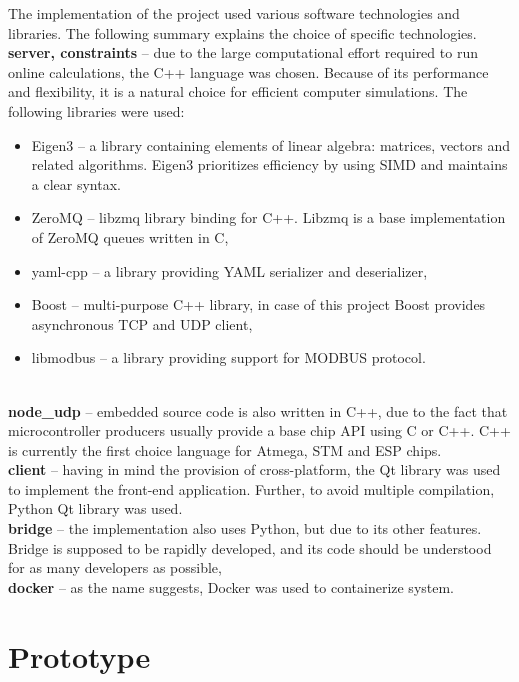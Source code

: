 The implementation of the project used various software technologies and libraries. The following summary explains the choice of specific technologies.\\

\noindent\textbf{server, constraints} -- due to the large computational effort required to run online calculations, the C++ language was chosen. Because of its performance and flexibility, it is a natural choice for efficient computer simulations. The following libraries were used:
\begin{itemize}[noitemsep,nolistsep]
	\item Eigen3 -- a library containing elements of linear algebra: matrices, vectors and related algorithms. Eigen3 prioritizes efficiency by using SIMD and maintains a clear syntax.
	\item ZeroMQ -- libzmq library binding for C++. Libzmq is a base implementation of ZeroMQ queues written in C,
	\item yaml-cpp -- a library providing YAML serializer and deserializer,
	\item Boost -- multi-purpose C++ library, in case of this project Boost provides asynchronous TCP and UDP client,
	\item libmodbus -- a library providing support for MODBUS protocol.
\end{itemize}
\  \\
\textbf{node\_udp} -- embedded source code is also written in C++, due to the fact that microcontroller producers usually provide a base chip API using C or C++. C++ is currently the first choice language for Atmega, STM and ESP chips.\\

\noindent\textbf{client} -- having in mind the provision of cross-platform, the Qt library was used to implement the front-end application. Further, to avoid multiple compilation, Python Qt library was used. \\

\noindent\textbf{bridge} -- the implementation also uses Python, but due to its other features. Bridge is supposed to be rapidly developed, and its code should be understood for as many developers as possible,\\

\noindent\textbf{docker} -- as the name suggests, Docker was used to containerize system.   
	
\section{Prototype}

